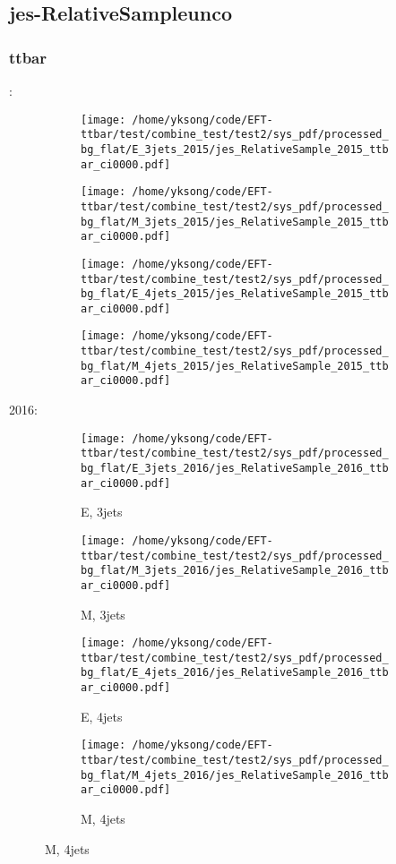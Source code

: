 \documentclass{beamer}
\begin{document}
\subsection{jes-RelativeSampleunco}

\begin{frame}
\frametitle{ttbar}
\fontsize{5}{1}:
\begin{figure}
\centering
\begin{subfigure}[b]{0.24\textwidth}
\texttt{[image: /home/yksong/code/EFT-ttbar/test/combine\_test/test2/sys\_pdf/processed\_bg\_flat/E\_3jets\_2015/jes\_RelativeSample\_2015\_ttbar\_ci0000.pdf]}
\end{subfigure}
\begin{subfigure}[b]{0.24\textwidth}
\texttt{[image: /home/yksong/code/EFT-ttbar/test/combine\_test/test2/sys\_pdf/processed\_bg\_flat/M\_3jets\_2015/jes\_RelativeSample\_2015\_ttbar\_ci0000.pdf]}
\end{subfigure}
\begin{subfigure}[b]{0.24\textwidth}
\texttt{[image: /home/yksong/code/EFT-ttbar/test/combine\_test/test2/sys\_pdf/processed\_bg\_flat/E\_4jets\_2015/jes\_RelativeSample\_2015\_ttbar\_ci0000.pdf]}
\end{subfigure}
\begin{subfigure}[b]{0.24\textwidth}
\texttt{[image: /home/yksong/code/EFT-ttbar/test/combine\_test/test2/sys\_pdf/processed\_bg\_flat/M\_4jets\_2015/jes\_RelativeSample\_2015\_ttbar\_ci0000.pdf]}
\end{subfigure}
\end{figure}
2016:
\begin{figure}
\centering
\begin{subfigure}[b]{0.24\textwidth}
\texttt{[image: /home/yksong/code/EFT-ttbar/test/combine\_test/test2/sys\_pdf/processed\_bg\_flat/E\_3jets\_2016/jes\_RelativeSample\_2016\_ttbar\_ci0000.pdf]}
\captionsetup{font=tiny}
\caption{E, 3jets}
\end{subfigure}
\begin{subfigure}[b]{0.24\textwidth}
\texttt{[image: /home/yksong/code/EFT-ttbar/test/combine\_test/test2/sys\_pdf/processed\_bg\_flat/M\_3jets\_2016/jes\_RelativeSample\_2016\_ttbar\_ci0000.pdf]}
\captionsetup{font=tiny}
\caption{M, 3jets}
\end{subfigure}
\begin{subfigure}[b]{0.24\textwidth}
\texttt{[image: /home/yksong/code/EFT-ttbar/test/combine\_test/test2/sys\_pdf/processed\_bg\_flat/E\_4jets\_2016/jes\_RelativeSample\_2016\_ttbar\_ci0000.pdf]}
\captionsetup{font=tiny}
\caption{E, 4jets}
\end{subfigure}
\begin{subfigure}[b]{0.24\textwidth}
\texttt{[image: /home/yksong/code/EFT-ttbar/test/combine\_test/test2/sys\_pdf/processed\_bg\_flat/M\_4jets\_2016/jes\_RelativeSample\_2016\_ttbar\_ci0000.pdf]}
\captionsetup{font=tiny}
\caption{M, 4jets}
\end{subfigure}
\end{figure}
\end{frame}
\end{document}
